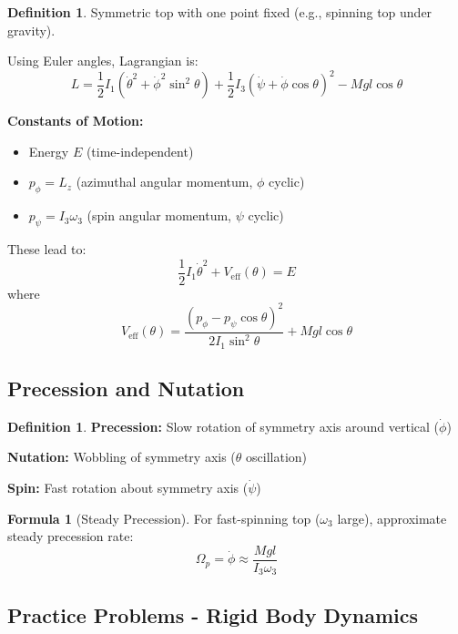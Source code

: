 \documentclass[12pt,a4paper]{article}
\theoremstyle{definition}
\newtheorem{definition}[theorem]{Definition}
\newtheorem{formula}[theorem]{Formula}
\begin{document}
\begin{definition}
Symmetric top with one point fixed (e.g., spinning top under gravity).

Using Euler angles, Lagrangian is:
\[
L = \frac{1}{2}I_1(\dot{\theta}^2 + \dot{\phi}^2\sin^2\theta) + \frac{1}{2}I_3(\dot{\psi} + \dot{\phi}\cos\theta)^2 - Mgl\cos\theta
\]
\end{definition}

\begin{importantbox}
\textbf{Constants of Motion:}
\begin{itemize}
    \item Energy $E$ (time-independent)
    \item $p_\phi = L_z$ (azimuthal angular momentum, $\phi$ cyclic)
    \item $p_\psi = I_3\omega_3$ (spin angular momentum, $\psi$ cyclic)
\end{itemize}

These lead to:
\[
\frac{1}{2}I_1\dot{\theta}^2 + V_{\text{eff}}(\theta) = E
\]
where
\[
V_{\text{eff}}(\theta) = \frac{(p_\phi - p_\psi\cos\theta)^2}{2I_1\sin^2\theta} + Mgl\cos\theta
\]
\end{importantbox}

\subsection{Precession and Nutation}

\begin{definition}
\textbf{Precession:} Slow rotation of symmetry axis around vertical ($\dot{\phi}$)

\textbf{Nutation:} Wobbling of symmetry axis ($\theta$ oscillation)

\textbf{Spin:} Fast rotation about symmetry axis ($\dot{\psi}$)
\end{definition}

\begin{formula}[Steady Precession]
For fast-spinning top ($\omega_3$ large), approximate steady precession rate:
\[
\Omega_p = \dot{\phi} \approx \frac{Mgl}{I_3\omega_3}
\]
\end{formula}

\subsection{Practice Problems - Rigid Body Dynamics}
\end{document}
